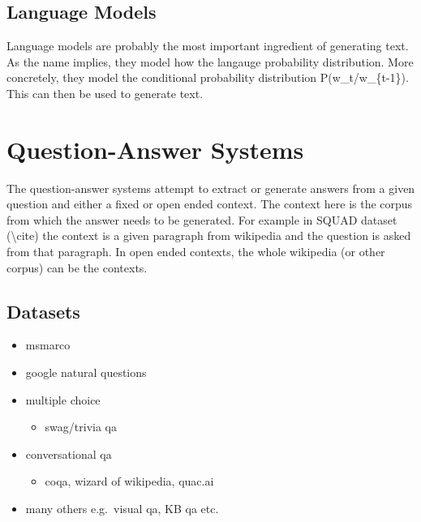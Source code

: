 \documentclass[]{krantz}
\providecommand{\tightlist}{%
  \setlength{\itemsep}{0pt}\setlength{\parskip}{0pt}}
\begin{document}
\hypertarget{language-models}{%
\section{Language Models}\label{language-models}}

Language models are probably the most important ingredient of generating text. As the name implies, they model how the langauge probability distribution. More concretely, they model the conditional probability distribution P(w\_t/w\_\{t-1\}). This can then be used to generate text.

\hypertarget{question-answer-systems}{%
\chapter{Question-Answer Systems}\label{question-answer-systems}}

The question-answer systems attempt to extract or generate answers from a given question and either a fixed or open ended context. The context here is the corpus from which the answer needs to be generated. For example in SQUAD dataset (\textbackslash{}cite) the context is a given paragraph from wikipedia and the question is asked from that paragraph. In open ended contexts, the whole wikipedia (or other corpus) can be the contexts.

\hypertarget{datasets-1}{%
\section{Datasets}\label{datasets-1}}

\begin{itemize}
\tightlist
\item
  msmarco
\item
  google natural questions
\item
  multiple choice

  \begin{itemize}
  \tightlist
  \item
    swag/trivia qa
  \end{itemize}
\item
  conversational qa

  \begin{itemize}
  \tightlist
  \item
    coqa, wizard of wikipedia, quac.ai
  \end{itemize}
\item
  many others e.g.~visual qa, KB qa etc.
\end{itemize}
\end{document}
